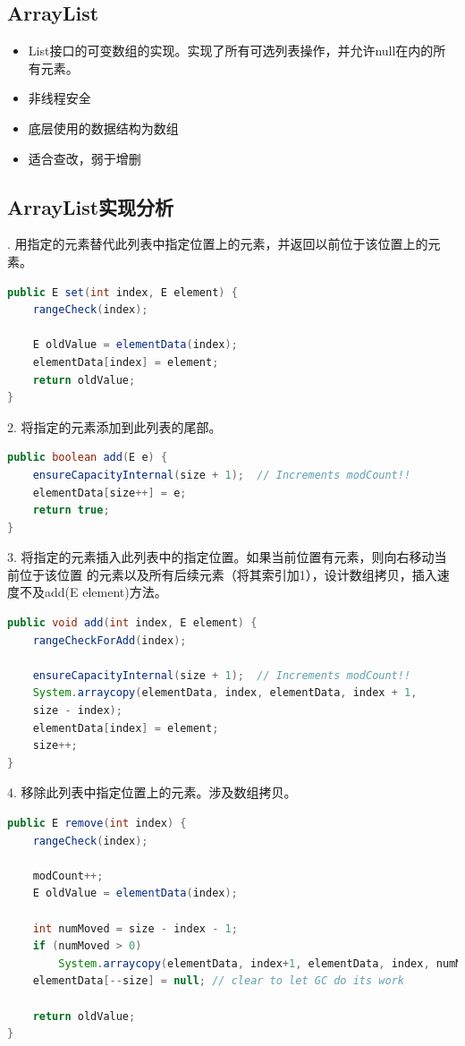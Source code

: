 \subsection{ArrayList}
\begin{itemize}
	\item List接口的可变数组的实现。实现了所有可选列表操作，并允许null在内的所有元素。
	\item 非线程安全
	\item 底层使用的数据结构为数组
	\item 适合查改，弱于增删
\end{itemize}
\subsection{ArrayList实现分析}
. 用指定的元素替代此列表中指定位置上的元素，并返回以前位于该位置上的元素。
\begin{lstlisting}[language=java]
public E set(int index, E element) {
	rangeCheck(index);
	
	E oldValue = elementData(index);
	elementData[index] = element;
	return oldValue;
}
\end{lstlisting}
2. 将指定的元素添加到此列表的尾部。
\begin{lstlisting}[language=java]
public boolean add(E e) {
	ensureCapacityInternal(size + 1);  // Increments modCount!!
	elementData[size++] = e;
	return true;
}
\end{lstlisting}
3. 将指定的元素插入此列表中的指定位置。如果当前位置有元素，则向右移动当前位于该位置
的元素以及所有后续元素（将其索引加1），设计数组拷贝，插入速度不及add(E element)方法。
\begin{lstlisting}[language=java]
public void add(int index, E element) {
	rangeCheckForAdd(index);
	
	ensureCapacityInternal(size + 1);  // Increments modCount!!
	System.arraycopy(elementData, index, elementData, index + 1,
	size - index);
	elementData[index] = element;
	size++;
}
\end{lstlisting}
4. 移除此列表中指定位置上的元素。涉及数组拷贝。
\begin{lstlisting}[language=java]
public E remove(int index) {
	rangeCheck(index);
	
	modCount++;
	E oldValue = elementData(index);
	
	int numMoved = size - index - 1;
	if (numMoved > 0)
		System.arraycopy(elementData, index+1, elementData, index, numMoved);
	elementData[--size] = null; // clear to let GC do its work
	
	return oldValue;
}
\end{lstlisting}
